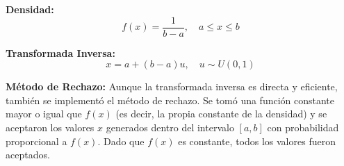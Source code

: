 \documentclass{article}
\begin{document}
\textbf{Densidad:}
\begin{equation}
f(x) = \frac{1}{b-a}, \quad a \leq x \leq b
\end{equation}

\textbf{Transformada Inversa:}
\begin{equation}
x = a + (b-a)u, \quad u \sim U(0,1)

\end{equation}

\textbf{Método de Rechazo:} Aunque la transformada inversa es directa y eficiente, también se implementó el método de rechazo. Se tomó una función constante mayor o igual que $f(x)$ (es decir, la propia constante de la densidad) y se aceptaron los valores $x$ generados dentro del intervalo $[a,b]$ con probabilidad proporcional a $f(x)$. Dado que $f(x)$ es constante, todos los valores fueron aceptados.
\end{document}
